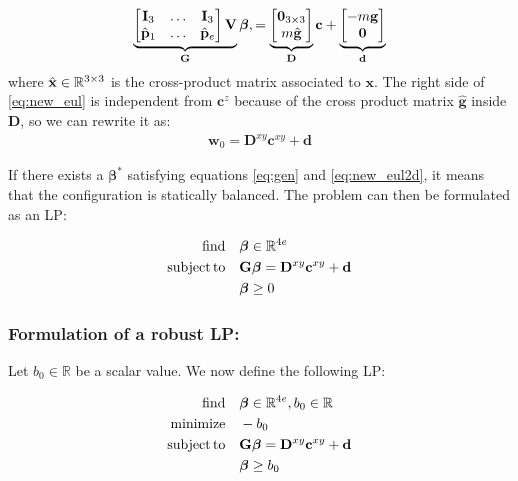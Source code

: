 \begin{align} \label{eq:new_eul}
\underbrace{
\mat{\mathbf{I}_3 & \dots & \mathbf{I}_3 \\
\hat{\mathbf{p}}_1 & \dots & \hat{\mathbf{p}}_e} \mathbf{V}
}_\mathbf{G} \bm{\beta}, = 
\underbrace{\mat{\mathbf{0}_{3\times 3} \\ m \hat{\mathbf{g}}}}_{\mathbf{D}} \mathbf{c} + 
\underbrace{\mat{-m\mathbf{g} \\ \mathbf{0}}}_{\mathbf{d}}
\end{align}
where $\hat{\mathbf{x}} \in \mathbb{R}^{3\times 3}$ is the cross-product matrix associated to $\mathbf{x}$.
The right side of \ref{eq:new_eul} is independent from $\mathbf{c}^z$ because of the cross product matrix $\hat{\mathbf{g}}$ inside $\mathbf{D}$, so we can rewrite it as:
\begin{align} \label{eq:new_eul2d}
\mathbf{w}_0 = \mathbf{D}^{xy} \mathbf{c}^{xy} + \mathbf{d}
\end{align}

If there exists a $\bm{\beta}^*$ satisfying equations \ref{eq:gen} and \ref{eq:new_eul2d}, it means that the configuration is statically balanced.
The problem can then be formulated as an LP:

\begin{equation} \label{eq:lin_prog} \begin{aligned}
\find \quad & \bm{\beta} \in \Rv{4e} \\
\st \quad &\mathbf{G} \bm{\beta} = \mathbf{D}^{xy} \mathbf{c}^{xy} + \mathbf{d} \\
& \bm{\beta} \ge 0 \\
\end{aligned} \end{equation}

\subsubsection{Formulation of a robust LP:}
Let $b_0 \in \mathbb{R}$ be a scalar value. We now define the following LP:

\begin{equation} \label{eq:lin_prog_rob} \begin{aligned}
\find \quad & \bm{\beta} \in \Rv{4e}, b_0 \in \Rv{} \\
\minimize  \quad & -b_0 \\
\st \quad &\mathbf{G} \bm{\beta} = \mathbf{D}^{xy} \mathbf{c}^{xy} + \mathbf{d} \\
& \bm{\beta} \ge b_0 \\
\end{aligned} \end{equation}

